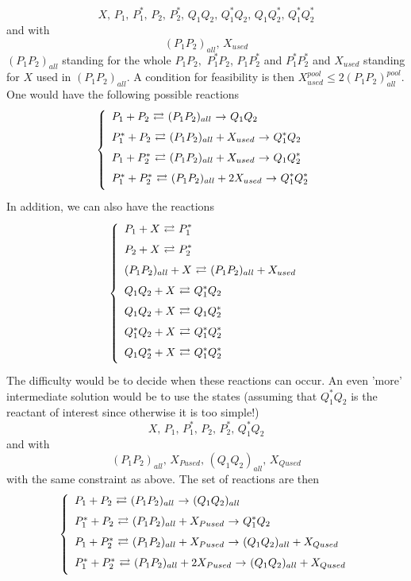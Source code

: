 $$
  X,\,P_1,\,P_1^*,\,P_2,\,P_2^*,\,Q_1Q_2,\,Q_1^*Q_2,\,Q_1Q_2^*,\,Q_1^*Q_2^*
$$
and with
$$
  (P_1P_2)_{all},\, X_{used}
$$
$(P_1P_2)_{all}$ standing for the whole $P_1P_2,$ $P_1^*P_2$, $P_1P_2^*$ and $P_1^*P_2^*$ and $X_{used}$ standing for $X$ used in $(P_1P_2)_{all}$. A condition for feasibility is then $X_{used}^{pool} \leq 2 (P_1P_2)_{all}^{pool}$. One would have the following possible reactions
$$
  \left\{
    \begin{array}{l}
      P_1+P_2 \,\, \displaystyle{\mathop{\rightleftarrows}_{}^{}} \,\, (P_1P_2)_{all} \,\, \displaystyle{\mathop{\rightarrow}^{}} \,\, Q_1Q_2 \\
      P_1^*+P_2 \,\, \displaystyle{\mathop{\rightleftarrows}_{}^{}} \,\, (P_1P_2)_{all}+X_{used} \,\, \displaystyle{\mathop{\rightarrow}^{}} \,\, Q_1^*Q_2 \\
      P_1+P_2^* \,\, \displaystyle{\mathop{\rightleftarrows}_{}^{}} \,\, (P_1P_2)_{all}+X_{used} \,\, \displaystyle{\mathop{\rightarrow}^{}} \,\, Q_1Q_2^* \\
      P_1^*+P_2^* \,\, \displaystyle{\mathop{\rightleftarrows}_{}^{}} \,\, (P_1P_2)_{all}+2 X_{used} \,\, \displaystyle{\mathop{\rightarrow}^{}} \,\, Q_1^*Q_2^* \\
    \end{array}
  \right.
$$
In addition, we can also have the reactions
$$
  \left\{
    \begin{array}{l}
      P_1 + X \,\, \displaystyle{\mathop{\rightleftarrows}_{}^{}} \,\, P_1^* \\
      P_2 + X \,\, \displaystyle{\mathop{\rightleftarrows}_{}^{}} \,\, P_2^* \\
      (P_1P_2)_{all} + X \,\, \displaystyle{\mathop{\rightleftarrows}_{}^{}} \,\, (P_1P_2)_{all} + X_{used} \\
      Q_1Q_2 + X \,\, \displaystyle{\mathop{\rightleftarrows}_{}^{}} \,\, Q_1^*Q_2 \\
      Q_1Q_2 + X \,\, \displaystyle{\mathop{\rightleftarrows}_{}^{}} \,\, Q_1Q_2^* \\
      Q_1^*Q_2 + X \,\, \displaystyle{\mathop{\rightleftarrows}_{}^{}} \,\, Q_1^*Q_2^* \\
      Q_1Q_2^* + X \,\, \displaystyle{\mathop{\rightleftarrows}_{}^{}} \,\, Q_1^*Q_2^* \\
    \end{array}
  \right.
$$
The difficulty would be to decide when these reactions can occur. An even 'more' intermediate solution would be to use the states (assuming that $Q_1^*Q_2$ is the reactant of interest since otherwise it is too simple!)
$$
  X,\,P_1,\,P_1^*,\,P_2,\,P_2^*,\,Q_1^*Q_2
$$
and with
$$
  (P_1P_2)_{all},\, X_{Pused},\,(Q_1Q_2)_{all},\, X_{Qused}
$$
with the same constraint as above. The set of reactions are then
$$
  \left\{
    \begin{array}{l}
      P_1+P_2 \,\, \displaystyle{\mathop{\rightleftarrows}_{}^{}} \,\, (P_1P_2)_{all} \,\, \displaystyle{\mathop{\rightarrow}^{}} \,\, (Q_1Q_2)_{all} \\
      P_1^*+P_2 \,\, \displaystyle{\mathop{\rightleftarrows}_{}^{}} \,\, (P_1P_2)_{all}+X_{Pused} \,\, \displaystyle{\mathop{\rightarrow}^{}} \,\, Q_1^*Q_2 \\
      P_1+P_2^* \,\, \displaystyle{\mathop{\rightleftarrows}_{}^{}} \,\, (P_1P_2)_{all}+X_{Pused} \,\, \displaystyle{\mathop{\rightarrow}^{}} \,\, (Q_1Q_2)_{all}+X_{Qused} \\
      P_1^*+P_2^* \,\, \displaystyle{\mathop{\rightleftarrows}_{}^{}} \,\, (P_1P_2)_{all}+2 X_{Pused} \,\, \displaystyle{\mathop{\rightarrow}^{}} \,\, (Q_1Q_2)_{all}+X_{Qused} \\
    \end{array}
  \right.
$$
